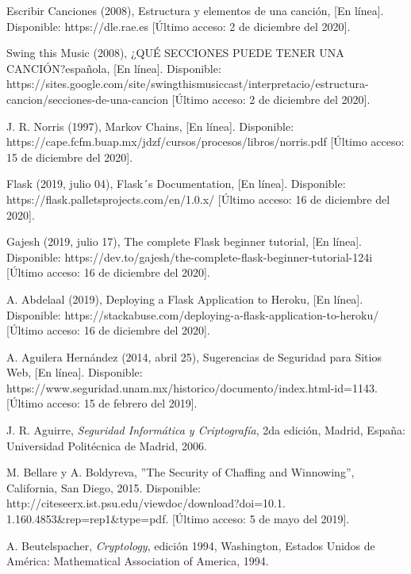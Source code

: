 \documentclass[12pt, a4paper, titlepage]{report}
\begin{document}
\begin{thebibliography}{20}
		Escribir Canciones (2008), Estructura y elementos de una canción, [En línea]. Disponible: https://dle.rae.es [Último acceso: 2 de diciembre del 2020].

		Swing this Music (2008), ¿QUÉ SECCIONES PUEDE TENER UNA CANCIÓN?española, [En línea]. Disponible: https://sites.google.com/site/swingthismusiccast/interpretacio/estructura-cancion/secciones-de-una-cancion [Último acceso: 2 de diciembre del 2020].

		J. R. Norris (1997), Markov Chains, [En línea]. Disponible: https://cape.fcfm.buap.mx/jdzf/cursos/procesos/libros/norris.pdf [Último acceso: 15 de diciembre del 2020].

		Flask (2019, julio 04), Flask´s Documentation, [En línea]. Disponible: https://flask.palletsprojects.com/en/1.0.x/ [Último acceso: 16 de diciembre del 2020].

		Gajesh (2019, julio 17), The complete Flask beginner tutorial, [En línea]. Disponible: https://dev.to/gajesh/the-complete-flask-beginner-tutorial-124i [Último acceso: 16 de diciembre del 2020].

		A. Abdelaal (2019), Deploying a Flask Application to Heroku, [En línea]. Disponible: https://stackabuse.com/deploying-a-flask-application-to-heroku/ [Último acceso: 16 de diciembre del 2020].
    
    
       
		A. Aguilera Hernández (2014, abril 25), Sugerencias de Seguridad para Sitios Web, [En línea]. Disponible: https://www.seguridad.unam.mx/historico/documento/index.html-id=1143. [Último acceso: 15 de febrero del 2019].
	    
        J. R. Aguirre, \textit{Seguridad Informática y Criptografía}, 2da edición, Madrid, España: Universidad Politécnica de Madrid, 2006.
	    
		M. Bellare y A. Boldyreva, ''The Security of Chaffing and Winnowing'', California, San Diego, 2015. Disponible: http://citeseerx.ist.psu.edu/viewdoc/download?doi=10.1.\\1.160.4853\&rep=rep1\&type=pdf. [Último acceso: 5 de mayo del 2019].
	
		A. Beutelspacher, \textit{Cryptology}, edición 1994, Washington, Estados Unidos de América: Mathematical Association of America, 1994.
		

\end{thebibliography}
\end{document}
